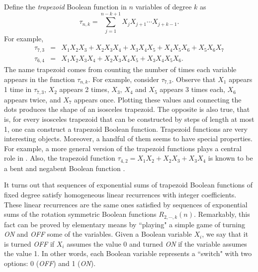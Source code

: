 Define the {\it trapezoid} Boolean function in $n$ variables of degree $k$ as
\begin{equation}
 \tau_{n,k} = \sum _{j=1}^{n-k+1} X_jX_{j+1}\cdots X_{j+k-1}.
\end{equation}
For example,
\begin{eqnarray*}
 \tau_{7,3}&=& X_1 X_2 X_3+X_2 X_3 X_4+X_3 X_4 X_5+X_4 X_5 X_6+X_5 X_6 X_7\\
 \tau_{6,4}&=& X_1 X_2 X_3 X_4+X_2 X_3 X_4 X_5+X_3 X_4 X_5 X_6.
\end{eqnarray*}
The name trapezoid comes from counting the number of times each variable appears in the function $\tau_{n,k}$.  For example, consider $\tau_{7,3}$.  Observe that $X_1$ appears 1 time in $\tau_{7,3}$, $X_2$ 
appears 2 times, $X_3$, $X_4$ and $X_5$ appears 3 times each, $X_6$ appears twice, and $X_7$ appears once.  Plotting these values and connecting the dots produces the shape of an isosceles trapezoid. 
The opposite is also true, that is, for every isosceles trapezoid that can be constructed by steps of length at most 1, one can construct a trapezoid Boolean function. Trapezoid functions are very interesting
objects. Moreover, a handful of them seems to have special properties.  For example, a more general version of the trapezoid functions plays a central role in \cite{browncusick}.  Also, the trapezoid function
$\tau_{4,2}=X_1X_2+X_2X_3+X_3X_4$
is known to be a bent and negabent Boolean function \cite{parkerpott}.


It turns out that sequences of exponential sums of trapezoid Boolean functions of fixed degree satisfy homogeneous linear recurrences with integer coefficients.  These linear recurrences are the same ones satisfied by sequences of exponential sums of the rotation symmetric Boolean functions $R_{2,\cdots, k}(n)$.  Remarkably, this fact can be proved by elementary means by ``playing" a simple game of turning 
{\it ON} and {\it OFF} some of the variables.   Given a Boolean variable $X_i$, we say that it is turned {\it OFF} if $X_i$ assumes the value 0 and turned {\it ON} if the variable assumes the value 1.
In other words, each Boolean variable represents a ``switch" with two options: 0 ({\it OFF}) and 1 ({\it ON}).

